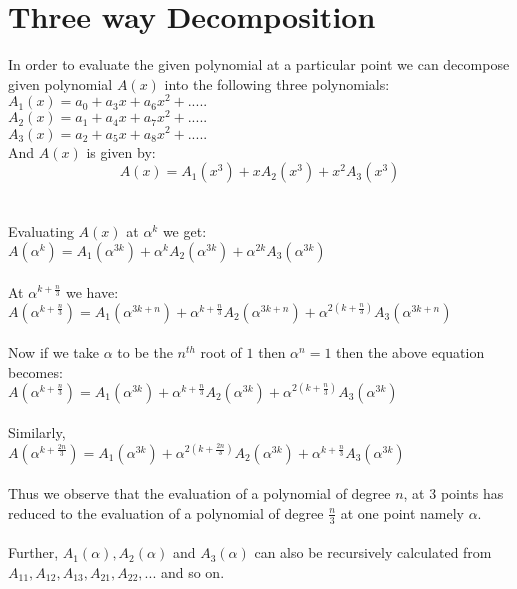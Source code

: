 \documentclass[10pt,a4paper]{article}
\begin{document}
\section{Three way Decomposition}
In order to evaluate the given polynomial at a particular point we can decompose given polynomial $A(x)$ into the following three polynomials:
\\$A_1(x)=a_0 + a_3x + a_6x^2 + .....$
\\$A_2(x)=a_1 + a_4x + a_7x^2 + .....$
\\$A_3(x)=a_2 + a_5x + a_8x^2 + .....$
\\And $A(x)$ is given by:
\begin{equation}
A(x) = A_1(x^3) + xA_2(x^3) + x^2A_3(x^3)
\end{equation}
\\\\Evaluating $A(x)$ at ${\alpha}^k$ we get:
\\$A({\alpha}^k) = A_1({\alpha}^{3k}) + {\alpha}^kA_2({\alpha}^{3k}) + {\alpha}^{2k}A_3({\alpha}^{3k})$
\\\\At ${\alpha}^{k+\frac{n}{3}}$ we have:
\\$A({\alpha}^{k+\frac{n}{3}}) = A_1({\alpha}^{3k+n}) + {\alpha}^{k+\frac{n}{3}}A_2({\alpha}^{3k+n}) + {\alpha}^{2(k+\frac{n}{3})}A_3({\alpha}^{3k+n})$
\\\\Now if we take $\alpha$ to be the $n^{th}$ root of $1$ then ${\alpha}^n = 1$ then the above equation becomes:
\\$A({\alpha}^{k+\frac{n}{3}}) = A_1({\alpha}^{3k}) + {\alpha}^{k+\frac{n}{3}}A_2({\alpha}^{3k}) + {\alpha}^{2(k+\frac{n}{3})}A_3({\alpha}^{3k})$
\\\\Similarly,
\\$A({\alpha}^{k+\frac{2n}{3}}) = A_1({\alpha}^{3k}) + {\alpha}^{2(k+\frac{2n}{3})}A_2({\alpha}^{3k}) + {\alpha}^{k+\frac{n}{3}}A_3({\alpha}^{3k})$
\\\\Thus we observe that the evaluation of a polynomial of degree $n$, at 3 points has reduced to the evaluation of a polynomial of degree $\frac{n}{3}$ at one point namely $\alpha$.\\\\Further, $A_1(\alpha),A_2(\alpha)$ and $A_3(\alpha)$ can also be recursively calculated from $A_{11},A_{12},A_{13},A_{21},A_{22},...$ and so on.
\end{document}
